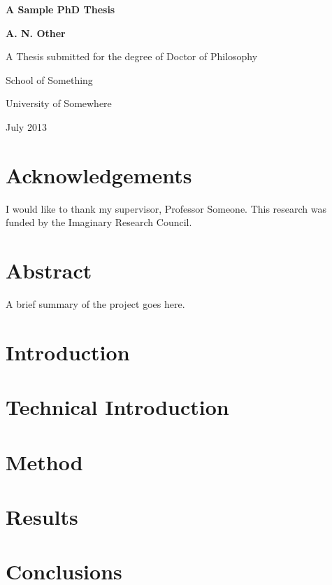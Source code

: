 \documentclass[oneside,12pt]{scrbook}
\begin{document}
\begin{titlepage}
\centering
\vspace*{1in}
\begin{Large}\bfseries
A Sample PhD Thesis\par
\end{Large}
\vspace{1.5in}
\begin{large}\bfseries
A. N. Other\par
\end{large}
\vfill
A Thesis submitted for the degree of Doctor of Philosophy
\par
\vspace{0.5in}
School of Something
\par
University of Somewhere
\par
\vspace{0.5in}
July 2013
\par
\end{titlepage}

\doublespacing

\frontmatter
\tableofcontents
\listoffigures
\listoftables

\chapter{Acknowledgements}

I would like to thank my supervisor, Professor Someone. This
research was funded by the Imaginary Research Council.

\chapter{Abstract}

A brief summary of the project goes here.

\mainmatter

\chapter{Introduction}
\label{ch:intro}

\lipsum

\chapter{Technical Introduction}
\label{ch:techintro}

\lipsum

\chapter{Method}
\label{ch:method}

\lipsum

\chapter{Results}
\label{ch:results}

\lipsum

\chapter{Conclusions}
\label{ch:conc}

\lipsum

\backmatter


\end{document}
